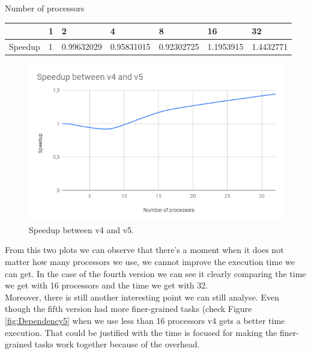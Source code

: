 \documentclass[12]{article}
\begin{document}
\begin{table}[h]
\begin{center}
Number of processors 
\end{center}
\begin{tabular}{l|l|l|l|l|l|l|}
\cline{2-7}
                              & 1 & 2              & 4              & 8              & 16            & 32            \\ \hline
\multicolumn{1}{|l|}{Speedup} & 1 & 0.99632029 & 0.95831015 & 0.92302725 & 1.1953915 & 1.4432771 \\ \hline
\end{tabular}
\end{table}


\begin{figure}[H]
\centering  \includegraphics[width=\linewidth]{images/Speedup.png}
  \caption{Speedup between v4 and v5.}
  \label{fig:PlotComparison}
\end{figure}


From this two plots we can observe that there's a moment when it does not matter how many processors we use, we cannot improve the execution time we can get. In the case of the fourth version we can see it clearly comparing the time we get with 16 processors and the time we get with 32. \\

Moreover, there is still another interesting point we can still analyse. Even though the fifth version had more finer-grained tasks (check Figure \ref{fig:Dependency5} when we use less than 16 processors v4 gets a better time execution. That could be justified with the time is focused for making the finer-grained tasks work together because of the overhead.  
\end{document}
